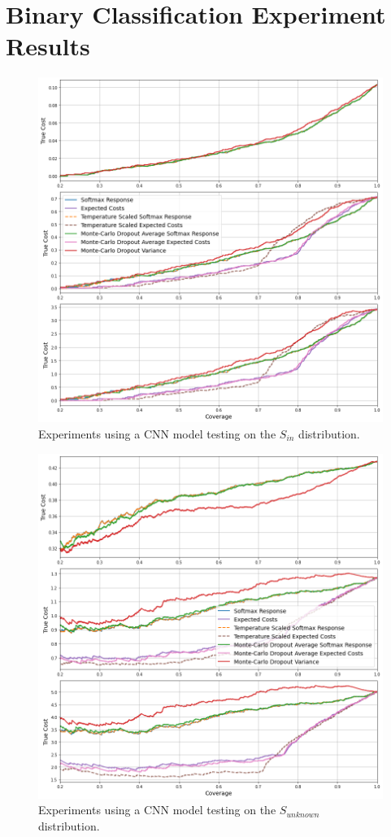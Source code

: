 \section{Binary Classification Experiment Results}
\begin{figure}[H]
	\includegraphics[width=\textwidth]{images/binary/cnn_in_distribution.png}
	\caption*{Experiments using a CNN model testing on the $S_{in}$ distribution.}
\end{figure}

\begin{figure}[H]
	\includegraphics[width=\textwidth]{images/binary/cnn_out_distribution.png}
	\caption*{Experiments using a CNN model testing on the $S_{unknown}$ distribution.}
\end{figure}

